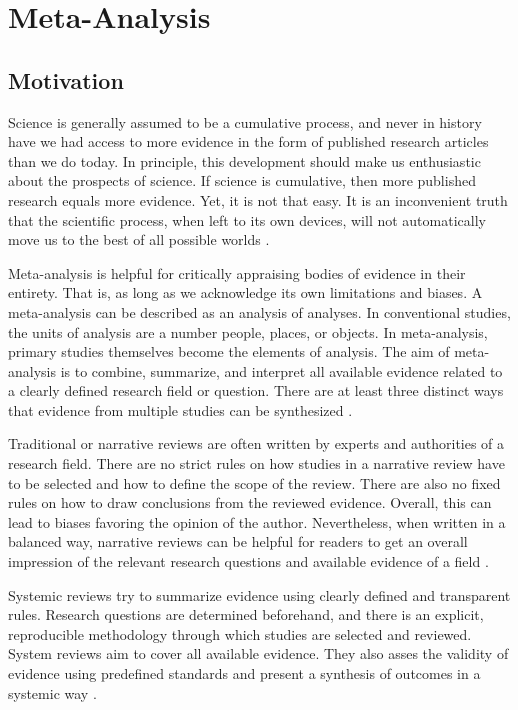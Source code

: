 \documentclass[../../../main.tex]{subfiles}
\begin{document}
\section{Meta-Analysis}\label{Appendix:MA}

\subsection{Motivation}

Science is generally assumed to be a cumulative process, and never in history have we had access to more evidence in the form of published research articles than we do today. In principle, this development should make us enthusiastic about the prospects of science. If science is cumulative, then more published research equals more evidence. Yet, it is not that easy. It is an inconvenient truth that the scientific process, when left to its own devices, will not automatically move us to the best of all possible worlds \autocite{Harrer2021}.

Meta-analysis is helpful for critically appraising bodies of evidence in their entirety. That is, as long as we acknowledge its own limitations and biases. A meta-analysis can be described as an analysis of analyses. In conventional studies, the units of analysis are a number people, places, or objects. In meta-analysis, primary studies themselves become the elements of analysis. The aim of meta-analysis is to combine, summarize, and interpret all available evidence related to a clearly defined research field or question. There are at least three distinct ways that evidence from multiple studies can be synthesized \autocite{Harrer2021}.

Traditional or narrative reviews are often written by experts and authorities of a research field. There are no strict rules on how studies in a narrative review have to be selected and how to define the scope of the review. There are also no fixed rules on how to draw conclusions from the reviewed evidence. Overall, this can lead to biases favoring the opinion of the author. Nevertheless, when written in a balanced way, narrative reviews can be helpful for readers to get an overall impression of the relevant research questions and available evidence of a field \autocite{Harrer2021}.

Systemic reviews try to summarize evidence using clearly defined and transparent rules. Research questions are determined beforehand, and there is an explicit, reproducible methodology through which studies are selected and reviewed. System reviews aim to cover all available evidence. They also asses the validity of evidence using predefined standards and present a synthesis of outcomes in a systemic way \autocite{Harrer2021}.
\end{document}
